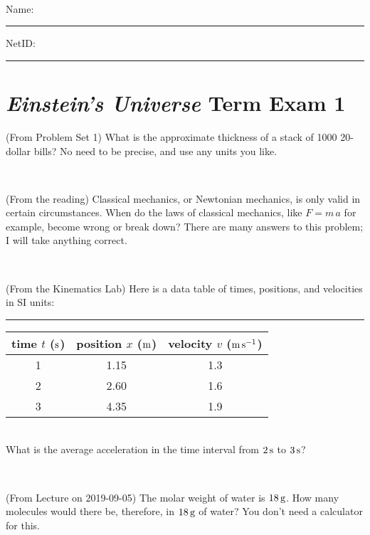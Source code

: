 \documentclass[12pt, letterpaper]{article}
\begin{document}
\vfill ~


\cleardoublepage



\noindent
Name: \rule[-1ex]{0.60\textwidth}{0.1pt}
NetID: \rule[-1ex]{0.20\textwidth}{0.1pt}

\section*{\textsl{Einstein's Universe} Term Exam 1}
\setcounter{problem}{1}


\begin{problem} (From Problem Set 1)
What is the approximate thickness of a stack of 1000 20-dollar bills?
No need to be precise, and use any units you like.
\end{problem}


\vfill ~

\begin{problem} (From the reading)
Classical mechanics, or Newtonian mechanics, is only valid in certain
circumstances. When do the laws of classical mechanics, like $F =
m\,a$ for example, become wrong or break down? There are many answers
to this problem; I will take anything correct.
\end{problem}


\vfill ~

\begin{problem} (From the Kinematics Lab)
Here is a data table of times, positions, and velocities in SI units:\\
\rule{1.0in}{0pt}\begin{tabular}{c|c|c}
time $t$ ($\mathrm{s}$) & position $x$ ($\mathrm{m}$) & velocity $v$ ($\mathrm{m}\,\mathrm{s}^{-1}$) \\
\hline
1 & 1.15 & 1.3 \\
2 & 2.60 & 1.6 \\
3 & 4.35 & 1.9 \\
\hline
\end{tabular}\\
What is the average acceleration in the time interval from $2\,\mathrm{s}$ to $3\,\mathrm{s}$?
\end{problem}


\vfill ~

\begin{problem} (From Lecture on 2019-09-05)
The molar weight of water is $18\,\mathrm{g}$. How many molecules would there
be, therefore, in $18\,\mathrm{g}$ of water? You don't need a calculator for
this.
\end{problem}
\end{document}
